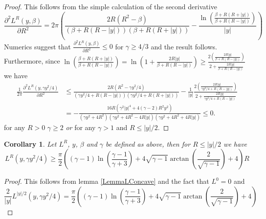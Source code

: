 \documentclass[a4paper,11pt]{article}
\newcommand{\abs}[1]{\left\lvert #1 \right\rvert}
\newtheorem{corollary}{Corollary}
\numberwithin{equation}{section}
\begin{document}
\begin{proof}
	This follows from the simple calculation of the second derivative\begin{equation}
	\frac{\partial^2L^R(y,\beta)}{\partial R^2}=2\pi\left(\frac{2 R \left(R^2-\beta \right)}{\left(\beta +R(R- \abs{y})\right) (\beta +R (R+\abs{y}))}-\frac{\ln \left(\frac{\beta +R (R+\abs{y})}{\beta +R(R- \abs{y})}\right)}{\abs{y}}\right)
	\end{equation}
	Numerics suggest that $ \frac{\partial^2L^R(y,\beta)}{\partial R^2}\leq0 $ for $ \gamma\geq4/3 $ and the result follows. Furthermore, since $ \ln \left(\frac{\beta +R (R+\abs{y})}{\beta +R(R- \abs{y})}\right)=\ln \left(1+\frac{2R\abs{y}}{\beta +R(R- \abs{y})}\right)\geq\frac{2\left(\frac{2R\abs{y}}{\beta +R(R- \abs{y})}\right)}{2+\frac{2R\abs{y}}{\beta +R(R- \abs{y})}} $ we have \begin{equation}
	\begin{aligned}
	\frac{1}{2\pi}\frac{\partial^2L^R(y,\gamma y^2/4)}{\partial R^2}&\leq \frac{2 R \left(R^2-\gamma y^2/4 \right)}{\left(\gamma y^2/4 +R(R- \abs{y})\right) (\gamma y^2/4 +R (R+\abs{y}))}-\frac{1}{\abs{y}}\frac{2\left(\frac{2R\abs{y}}{\gamma y^2/4 +R(R- \abs{y})}\right)}{2+\frac{2R\abs{y}}{\gamma y^2/4 +R(R- \abs{y})}}\\&=-\frac{16 R \left(\gamma^2 \abs{y}^4+4 (\gamma-2) R^2 y^2\right)}{\left(\gamma y^2+4 R^2\right) \left(\gamma y^2+4 R^2-4 R \abs{y}\right) \left(\gamma y^2+4 R^2+4 R \abs{y}\right)}\leq0.
	\end{aligned}
	\end{equation}
	for any $ R>0 $ $ \gamma\geq2 $ \emph{or} for any $ \gamma>1 $ and $ R\leq\abs{y}/2 $.
\end{proof}
\begin{corollary}\label{ColollaryConcaveLRBound}
	Let $ L^R $, $ y $, $ \beta $ and $ \gamma $ be defined as above, then for $ R\leq\abs{y}/2 $ we have \begin{equation}
	L^R(y,\gamma y^2/4)\geq \frac{\pi}{2} \left((\gamma -1) \ln \left(\frac{\gamma -1}{\gamma+3}\right)+4 \sqrt{\gamma -1} \arctan\left(\frac{2}{\sqrt{\gamma -1}}\right)+4\right)R
	\end{equation}
\end{corollary}
\begin{proof}
	This follows from lemma \ref{LemmaLConcave} and the fact that $ L^0=0  $ and \begin{equation}
	\frac{2}{\abs{y}}L^{\abs{y}/2}(y,\gamma y^2/4)=\frac{\pi}{2} \left((\gamma -1) \ln \left(\frac{\gamma -1}{\gamma+3}\right)+4 \sqrt{\gamma -1} \arctan\left(\frac{2}{\sqrt{\gamma -1}}\right)+4\right)
	\end{equation}
\end{proof}
\end{document}
